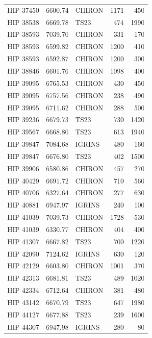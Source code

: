 {\begin{scriptsize}
\begin{longtable}{|l|rlrr|}
   HIP 37450 &  6600.74 &     CHIRON &     1171 &   450 \\
   HIP 38538 &  6669.78 &       TS23 &      474 &  1990 \\
   HIP 38593 &  7039.70 &     CHIRON &      331 &   170 \\
   HIP 38593 &  6599.82 &     CHIRON &     1200 &   410 \\
   HIP 38593 &  6592.87 &     CHIRON &     1200 &   300 \\
   HIP 38846 &  6601.76 &     CHIRON &     1098 &   400 \\
   HIP 39095 &  6765.53 &     CHIRON &      430 &   450 \\
   HIP 39095 &  6757.56 &     CHIRON &      238 &   490 \\
   HIP 39095 &  6711.62 &     CHIRON &      288 &   500 \\
   HIP 39236 &  6679.73 &       TS23 &      730 &  1420 \\
   HIP 39567 &  6668.80 &       TS23 &      613 &  1940 \\
   HIP 39847 &  7084.68 &     IGRINS &      480 &   160 \\
   HIP 39847 &  6676.80 &       TS23 &      402 &  1500 \\
   HIP 39906 &  6580.86 &     CHIRON &      457 &   270 \\
   HIP 40429 &  6691.72 &     CHIRON &      710 &   560 \\
   HIP 40706 &  6327.64 &     CHIRON &      277 &   630 \\
   HIP 40881 &  6947.97 &     IGRINS &      240 &   100 \\
   HIP 41039 &  7039.73 &     CHIRON &     1728 &   530 \\
   HIP 41039 &  6330.77 &     CHIRON &      404 &   400 \\
   HIP 41307 &  6667.82 &       TS23 &      700 &  1220 \\
   HIP 42090 &  7124.62 &     IGRINS &      630 &   120 \\
   HIP 42129 &  6603.80 &     CHIRON &     1001 &   370 \\
   HIP 42313 &  6681.81 &       TS23 &      489 &  1020 \\
   HIP 42334 &  6712.64 &     CHIRON &      381 &   480 \\
   HIP 43142 &  6670.79 &       TS23 &      647 &  1980 \\
   HIP 44127 &  6677.88 &       TS23 &      239 &  1600 \\
   HIP 44307 &  6947.98 &     IGRINS &      280 &    80 \\

\end{longtable}
\end{scriptsize}}
